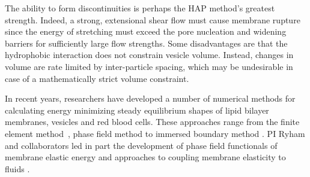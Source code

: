 The ability to form discontinuities is perhaps the HAP method's greatest 
strength. Indeed, a strong, extensional shear flow must cause membrane rupture since the 
energy of stretching must exceed the pore nucleation and widening barriers 
for sufficiently large flow strengths. 
Some disadvantages are that the hydrophobic interaction does not constrain vesicle volume. 
Instead, changes in volume are rate limited by inter-particle spacing,
which may be undesirable in case of a mathematically strict volume constraint.

In recent years, researchers have developed a number of numerical methods for calculating
energy minimizing steady equilibrium shapes of lipid bilayer membranes, vesicles and red blood cells.
These approaches range from the finite element method~\cite{Bartels,Peng13,RyKlYaCo16,Sinha15}, 
phase field method \cite{Du05,QiangDu08,Lowengrub13} to immersed
boundary method  \cite{Hu,Hu13, KimLai2010_JCP}.
PI Ryham and collaborators led in part the development of phase field
functionals of membrane elastic energy and approaches to coupling membrane elasticity to fluids  \cite{0951-7715-18-3-016,Du05,DuEuler,QiangDu09}.

